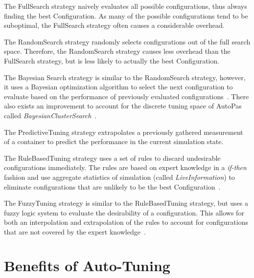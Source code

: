 \documentclass[conference]{IEEEtran}
\begin{document}
\begin{description}[style=nextline]
    \item[FullSearch]
        The FullSearch strategy naively evaluates all possible configurations, thus always finding the best Configuration. As many of the possible configurations tend to be suboptimal\cite{Manuel_Lerchner_Thesis.pdf}, the FullSearch strategy often causes a considerable overhead.

    \item[RandomSearch]
        The RandomSearch strategy randomly selects configurations out of the full search space. Therefore, the RandomSearch strategy causes less overhead than the FullSearch strategy, but is less likely to actually the best Configuration.

    \item[BayesianSearch]
        The Bayesian Search strategy is similar to the RandomSearch strategy, however, it uses a Bayesian optimization algorithm to select the next configuration to evaluate based on the performance of previously evaluated configurations~\cite{njan_master}. There also exists an improvement to account for the discrete tuning space of AutoPas called \textit{BayesianClusterSearch}~\cite{njan_master}.

    \item[PredictiveTuning]
        The PredictiveTuning strategy extrapolates a previously gathered measurement of a container to predict the performance in the current simulation state.

    \item[RuleBasedTuning]
        The RuleBasedTuning strategy uses a set of rules to discard undesirable configurations immediately. The rules are based on expert knowledge in a \textit{if-then} fashion and use aggregate statistics of simulation (called \textit{LiveInformation}) to eliminate configurations that are unlikely to be the best Configuration~\cite{endreport.pdf}.

    \item[FuzzyTuning]
        The FuzzyTuning strategy is similar to the RuleBasedTuning strategy, but uses a fuzzy logic system to evaluate the desirability of a configuration. This allows for both an interpolation and extrapolation of the rules to account for configurations that are not covered by the expert knowledge~\cite{Manuel_Lerchner_Thesis.pdf}.

\end{description}

\section{Benefits of Auto-Tuning}
\end{document}
